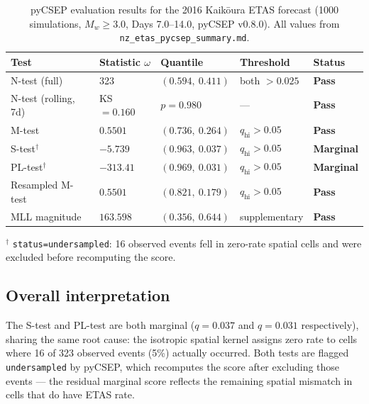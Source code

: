 \documentclass[12pt,a4paper]{article}
\begin{document}
\begin{table}[h!]
\centering
\caption{pyCSEP evaluation results for the 2016 Kaik\={o}ura ETAS forecast
         (1000 simulations, $M_w \geq 3.0$, Days 7.0--14.0, pyCSEP v0.8.0).
         All values from \texttt{nz\_etas\_pycsep\_summary.md}.}
\begin{tabular}{p{3.8cm} p{2.8cm} p{2.5cm} p{2.2cm} p{2cm}}
\toprule
\textbf{Test} & \textbf{Statistic $\omega$} & \textbf{Quantile} & \textbf{Threshold} & \textbf{Status} \\
\midrule
N-test (full)          & 323               & $(0.594,\ 0.411)$ & both $>0.025$  & \textcolor{passgreen}{\textbf{Pass}}      \\
N-test (rolling, 7d)   & KS $= 0.160$      & $p = 0.980$       & ---            & \textcolor{passgreen}{\textbf{Pass}}      \\
M-test                 & $0.5501$          & $(0.736,\ 0.264)$ & $q_\text{hi}>0.05$ & \textcolor{passgreen}{\textbf{Pass}}  \\
S-test$^\dagger$       & $-5.739$          & $(0.963,\ 0.037)$ & $q_\text{hi}>0.05$ & \textcolor{warnorange}{\textbf{Marginal}} \\
PL-test$^\dagger$      & $-313.41$         & $(0.969,\ 0.031)$ & $q_\text{hi}>0.05$ & \textcolor{warnorange}{\textbf{Marginal}} \\
Resampled M-test       & $0.5501$          & $(0.821,\ 0.179)$ & $q_\text{hi}>0.05$ & \textcolor{passgreen}{\textbf{Pass}}  \\
MLL magnitude          & $163.598$         & $(0.356,\ 0.644)$ & supplementary  & \textcolor{passgreen}{\textbf{Pass}}      \\
\bottomrule
\end{tabular}

\smallskip
\noindent $^\dagger$ \texttt{status=undersampled}: 16 observed events fell in
zero-rate spatial cells and were excluded before recomputing the score.
\end{table}

\subsection{Overall interpretation}

The S-test and PL-test are both marginal ($q = 0.037$ and $q = 0.031$
respectively), sharing the same root cause: the isotropic spatial kernel
assigns zero rate to cells where 16 of 323 observed events (5\%) actually
occurred. Both tests are flagged \texttt{undersampled} by pyCSEP, which
recomputes the score after excluding those events --- the residual marginal
score reflects the remaining spatial mismatch in cells that do have ETAS rate.
\end{document}
